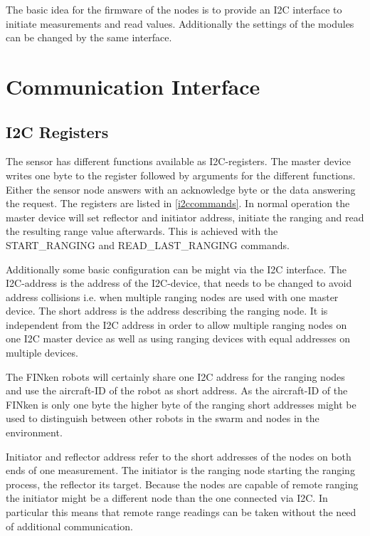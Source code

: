 
The basic idea for the firmware of the nodes is to provide an I2C interface to initiate measurements and read values.
Additionally the settings of the modules can be changed by the same interface.


\section{Communication Interface}


\subsection{I2C Registers}
The sensor has different functions available as I2C-registers.
The master device writes one byte to the register followed by arguments for the different functions.
Either the sensor node answers with an acknowledge byte or the data answering the request.
The registers are listed in \autoref{i2ccommands}.
In normal operation the master device will set reflector and initiator address, initiate the ranging and read the resulting range value afterwards.
This is achieved with the START\_RANGING and READ\_LAST\_RANGING commands.

Additionally some basic configuration can be might via the I2C interface.
The I2C-address is the address of the I2C-device, that needs to be changed to avoid address collisions i.e. when multiple ranging nodes are used with one master device.
The short address is the address describing the ranging node.
It is independent from the I2C address in order to allow multiple ranging nodes on one I2C master device as well as using ranging devices with equal addresses on multiple devices.

The FINken robots will certainly share one I2C address for the ranging nodes and use the aircraft-ID of the robot as short address.
As the aircraft-ID of the FINken is only one byte the higher byte of the ranging short addresses might be used to distinguish between other robots in the swarm and nodes in the environment.

Initiator and reflector address refer to the short addresses of the nodes on both ends of one measurement.
The initiator is the ranging node starting the ranging process, the reflector its target.
Because the nodes are capable of remote ranging the initiator might be a different node than the one connected via I2C.
In particular this means that remote range readings can be taken without the need of additional communication.

